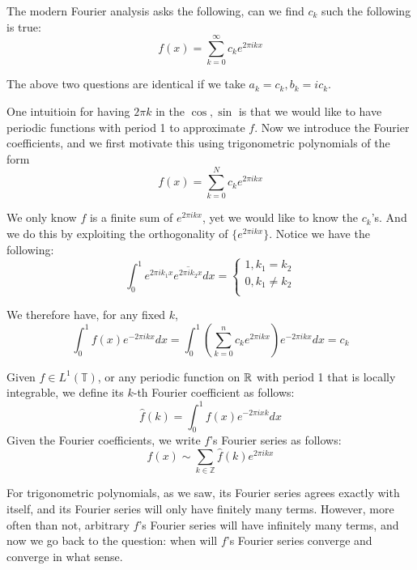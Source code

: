 The modern Fourier analysis asks the following, can we find $c_k$ such the following is true:
\begin{equation*}
    f(x)=\sum_{k=0}^\infty c_ke^{2\pi ikx}
\end{equation*}

The above two questions are identical if we take $a_k=c_k, b_k=ic_k$.

One intuitioin for having $2\pi k$ in the $\cos, \sin$ is that we would like to have periodic functions with period 1 to approximate $f$. Now we introduce the Fourier coefficients, and we first motivate this using trigonometric polynomials of the form 
\begin{equation*}
    f(x)=\sum_{k=0}^N c_ke^{2\pi ikx}
\end{equation*}

We only know $f$ is a finite sum of $e^{2\pi ikx}$, yet we would like to know the $c_k$'s. And we do this by exploiting the orthogonality of $\{e^{2\pi ikx}\}$. Notice we have the following:
\begin{equation*}
    \int_0^1 e^{2\pi ik_1x}\overline{e^{2\pi ik_2x}}dx=\begin{cases}
        1, k_1=k_2\\
        0, k_1\neq k_2\\
    \end{cases}
\end{equation*}

We therefore have, for any fixed $k$, 
\begin{equation*}
    \int_0^1f(x)e^{-2\pi ikx}dx=\int_0^1\left(\sum_{k=0}^nc_ke^{2\pi ikx}\right)e^{-2\pi ikx}dx=c_k
\end{equation*}


\begin{definition}
    Given $f\in L^1(\mathbb{T})$, or any periodic function on $\mathbb{R}$ with period 1 that is locally integrable, we define its $k$-th Fourier coefficient as follows:
    \begin{equation*}
        \hat{f}(k)=\int_0^1f(x)e^{-2\pi ixk}dx
    \end{equation*}
    Given the Fourier coefficients, we write $f$'s Fourier series as follows:
    \begin{equation*}
        f(x)\sim \sum_{k\in\mathbb{Z}}\hat{f}(k)e^{2\pi ikx}
    \end{equation*}
\end{definition}

For trigonometric polynomials, as we saw, its Fourier series agrees exactly with itself, and its Fourier series will only have finitely many terms. However, more often than not, arbitrary $f$'s Fourier series will have infinitely many terms, and now we go back to the question: when will $f$'s Fourier series converge and converge in what sense.

